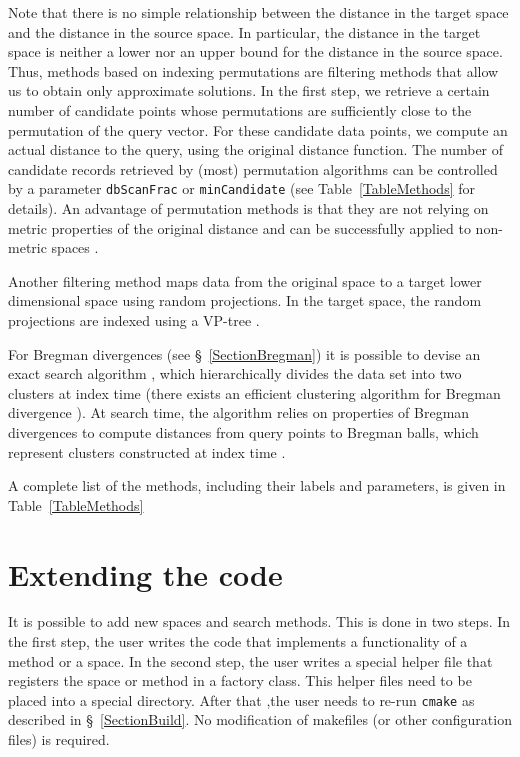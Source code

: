 \documentclass[runningheads,a4paper]{llncs}
\newcommand{\ttt}[1]{\texttt{#1}}
\begin{document}
{Note that there is no simple relationship between the distance in the target space
and the distance in the source space. In particular, the distance in the target space is neither a lower nor an upper bound
for the distance in the source space.
Thus, methods based on indexing permutations are filtering methods that allow us to obtain only approximate solutions.
In the first step, we retrieve a certain number of candidate points whose permutations are sufficiently close
to the permutation of the query vector.
For these candidate data points, we compute an actual distance to the query, using the original distance function.
The number of candidate records retrieved by (most) permutation algorithms can be controlled by a parameter \ttt{dbScanFrac} or \ttt{minCandidate} (see Table~\ref{TableMethods} for details).
An advantage of permutation methods is that they are not relying on metric properties of the original distance 
and can be successfully applied to non-metric spaces \cite{Boytsov_and_Bilegsaikhan:nips2013}.

Another filtering method maps data from the original space to a target lower dimensional space
using random projections. In the target space, the random projections are indexed using
a VP-tree \cite{Uhlmann:1991,Yianilos:1993}.

For Bregman divergences (see \S~\ref{SectionBregman}) it is possible to devise
an exact search algorithm \cite{Cayton:2008},
which hierarchically divides the data set into two clusters  
at index time (there exists an efficient clustering algorithm for Bregman divergence \cite{banerjee2005clustering}).
At search time,
the algorithm relies on properties of Bregman divergences to compute distances from query points to Bregman balls,
which represent clusters constructed at index time \cite{Cayton:2008}.

A complete list of the methods, including their labels and parameters, is given in Table~\ref{TableMethods}

\section{Extending the code}\label{SectionExtend}
It is possible to add new spaces and search methods.
This is done in two steps. 
In the first step, the user writes the code that implements a
functionality of a method or a space.
In the second step, the user writes a special helper file  
that registers the space or method in a factory class.
This helper files need to be placed into a special directory.
After that ,the user needs to re-run \ttt{cmake} as described in \S~\ref{SectionBuild}.
No modification of makefiles (or other configuration files) is required.

}
\end{document}
